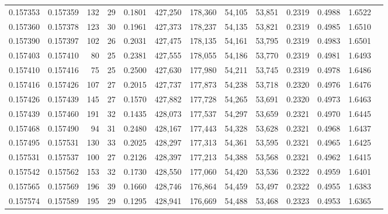 \begin{tabular}{rrrrrrrrrrrrr}
0.157353 & 0.157359 &   132 &  29 &                                     0.1801 & 427,250 & 178,360 &  54,105 &  53,851 & 0.2319 & 0.4988 & 1.6522 \\
0.157360 & 0.157378 &   123 &  30 &                                     0.1961 & 427,373 & 178,237 &  54,135 &  53,821 & 0.2319 & 0.4985 & 1.6510 \\
0.157390 & 0.157397 &   102 &  26 &                                     0.2031 & 427,475 & 178,135 &  54,161 &  53,795 & 0.2319 & 0.4983 & 1.6501 \\
0.157403 & 0.157410 &    80 &  25 &                                     0.2381 & 427,555 & 178,055 &  54,186 &  53,770 & 0.2319 & 0.4981 & 1.6493 \\
0.157410 & 0.157416 &    75 &  25 &                                     0.2500 & 427,630 & 177,980 &  54,211 &  53,745 & 0.2319 & 0.4978 & 1.6486 \\
0.157416 & 0.157426 &   107 &  27 &                                     0.2015 & 427,737 & 177,873 &  54,238 &  53,718 & 0.2320 & 0.4976 & 1.6476 \\
0.157426 & 0.157439 &   145 &  27 &                                     0.1570 & 427,882 & 177,728 &  54,265 &  53,691 & 0.2320 & 0.4973 & 1.6463 \\
0.157439 & 0.157460 &   191 &  32 &                                     0.1435 & 428,073 & 177,537 &  54,297 &  53,659 & 0.2321 & 0.4970 & 1.6445 \\
0.157468 & 0.157490 &    94 &  31 &                                     0.2480 & 428,167 & 177,443 &  54,328 &  53,628 & 0.2321 & 0.4968 & 1.6437 \\
0.157495 & 0.157531 &   130 &  33 &                                     0.2025 & 428,297 & 177,313 &  54,361 &  53,595 & 0.2321 & 0.4965 & 1.6425 \\
0.157531 & 0.157537 &   100 &  27 &                                     0.2126 & 428,397 & 177,213 &  54,388 &  53,568 & 0.2321 & 0.4962 & 1.6415 \\
0.157542 & 0.157562 &   153 &  32 &                                     0.1730 & 428,550 & 177,060 &  54,420 &  53,536 & 0.2322 & 0.4959 & 1.6401 \\
0.157565 & 0.157569 &   196 &  39 &                                     0.1660 & 428,746 & 176,864 &  54,459 &  53,497 & 0.2322 & 0.4955 & 1.6383 \\
0.157574 & 0.157589 &   195 &  29 &                                     0.1295 & 428,941 & 176,669 &  54,488 &  53,468 & 0.2323 & 0.4953 & 1.6365 \\

\end{tabular}
